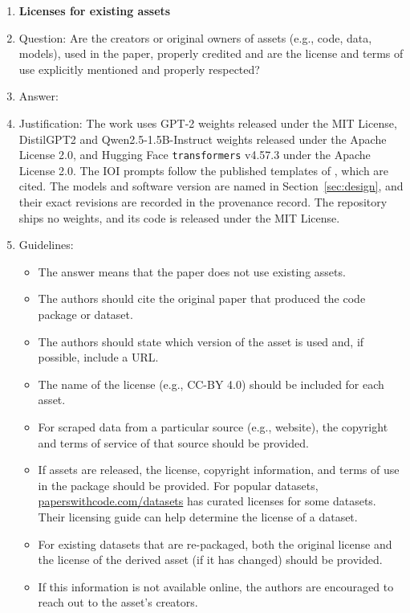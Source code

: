 \begin{enumerate}
\item {\bf Licenses for existing assets}
    \item[] Question: Are the creators or original owners of assets (e.g., code, data, models), used in the paper, properly credited and are the license and terms of use explicitly mentioned and properly respected?
    \item[] Answer: \answerYes{}
    \item[] Justification: The work uses GPT-2 weights released under the MIT License, DistilGPT2 and Qwen2.5-1.5B-Instruct weights released under the Apache License 2.0, and Hugging Face \texttt{transformers} v4.57.3 under the Apache License 2.0. The IOI prompts follow the published templates of \citet{wang2023interpretability}, which are cited. The models and software version are named in Section~\ref{sec:design}, and their exact revisions are recorded in the provenance record. The repository ships no weights, and its code is released under the MIT License.
    \item[] Guidelines:
    \begin{itemize}
        \item The answer \answerNA{} means that the paper does not use existing assets.
        \item The authors should cite the original paper that produced the code package or dataset.
        \item The authors should state which version of the asset is used and, if possible, include a URL.
        \item The name of the license (e.g., CC-BY 4.0) should be included for each asset.
        \item For scraped data from a particular source (e.g., website), the copyright and terms of service of that source should be provided.
        \item If assets are released, the license, copyright information, and terms of use in the package should be provided. For popular datasets, \url{paperswithcode.com/datasets} has curated licenses for some datasets. Their licensing guide can help determine the license of a dataset.
        \item For existing datasets that are re-packaged, both the original license and the license of the derived asset (if it has changed) should be provided.
        \item If this information is not available online, the authors are encouraged to reach out to the asset's creators.
    \end{itemize}


\end{enumerate}
